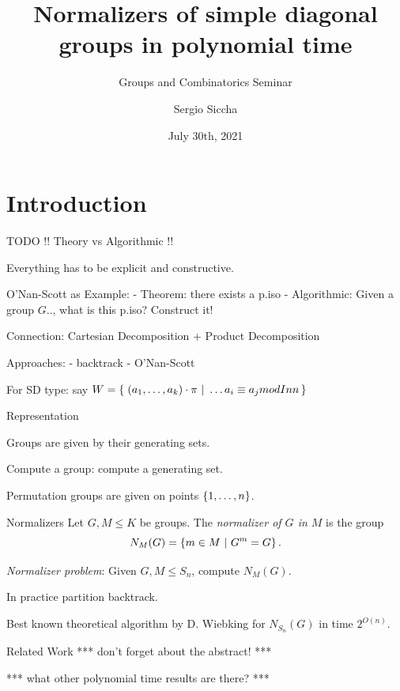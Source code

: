 \documentclass{beamer}
\title{Normalizers of simple diagonal groups in polynomial time}
\subtitle{Groups and Combinatorics Seminar}
\date{July 30th, 2021}
\author{Sergio Siccha}
\institute{TU Kaiserslautern}
\theoremstyle{plain}
\theoremstyle{definition}
\newcommand{\todo}[1]{{\color{red}*** #1 ***}}
\begin{document}
\maketitle
{}

\section{Introduction}
\begin{frame}{TODO}
!! Theory vs Algorithmic !!

Everything has to be explicit and constructive.

O'Nan-Scott as Example:
- Theorem: there exists a p.iso
- Algorithmic: Given a group $G .. $, what is this p.iso? Construct it!

Connection: Cartesian Decomposition + Product Decomposition

Approaches:
- backtrack
- O'Nan-Scott

For SD type: say
$W =  \left\{ \left.\, (a_1, \ldots, a_k) \cdot \pi  ~\right|~  \ldots a_i \equiv a_j mod Inn  \,\right\} $
\end{frame}

\begin{frame}{Representation}

Groups are given by their generating sets.

Compute a group: compute a generating set.

Permutation groups are given on points $ \left\{ 1, \ldots, n \right\} $.

\end{frame}

\begin{frame}{Normalizers}
Let $G, M \leq K$ be groups.
The \emph{normalizer of $G$ in $M$} is
the group
\[
N_M(G) =  \left\{  m \in M ~|~ G ^ m = G  \right\} .
\]

\pause
\emph{Normalizer problem}: Given $G, M \leq S_n$, compute $N_M(G)$.

\pause
In practice partition backtrack.

Best known theoretical algorithm by D. Wiebking for
$N_{S_n}(G)$ in
time $2 ^ {O(n)}$.
\end{frame}



\begin{frame}{Related Work}
\todo{don't forget about the abstract!}

\todo{what other polynomial time results are there?}
\end{frame}
\end{document}
